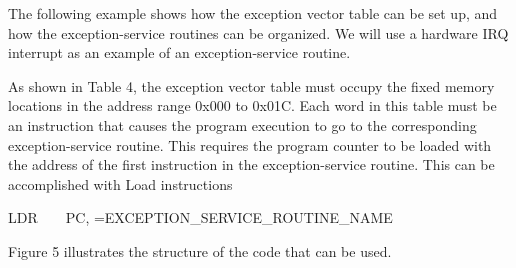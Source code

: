 \documentclass[11pt, twoside, pdftex]{article}
\begin{document}
The following example shows how the exception vector table can be
set up, and how the exception-service routines can be organized.
We will use a hardware IRQ interrupt as an example of an
exception-service routine.

As shown in Table 4, the exception vector table must occupy
the fixed memory locations in the address range 0x000 to 0x01C.
Each word in this table must be an instruction that causes the
program execution to go to the corresponding exception-service
routine. This requires the program counter to be loaded with
the address of the first instruction in the exception-service
routine. This can be accomplished with Load instructions
\begin{center}
LDR~~~~PC, =EXCEPTION\_SERVICE\_ROUTINE\_NAME
\end{center}
Figure 5 illustrates the structure of the code that can be used.
\end{document}
